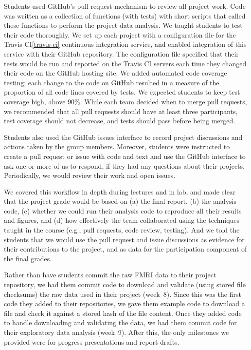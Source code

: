 Students used GitHub's pull request mechanism to review all project work.
Code was written as a collection of functions (with tests) with short
scripts that called these functions to perform the project data analysis.
We taught students to test their code thoroughly.
We set up each project with a configuration file for the Travis
CI\cref{travis-ci} continuous integration service, and enabled integration of
this service with their GitHub repository.  The configuration file specified
that their tests would be run and reported on the Travis CI servers each
time they changed their code on the GitHub hosting site.
We added automated code coverage testing; each change to the code on GitHub
resulted in a measure of the proportion of all code lines covered by tests.
We expected students to keep test coverage high, above 90\%.
While each team decided when to merge pull requests, we recommended that
all pull requests should have at least three participants, test coverage
should not decrease, and tests should pass before being merged.

Students also used the GitHub issues interface to record project discussions
and actions taken by the group members.
Moreover, students were instructed to create a pull request
or issue with code and text and use the GitHub interface to ask one or more
of us to respond, if they had any questions about their projects.
Periodically, we would review their work and open issues.

We covered this workflow in depth during lectures and in lab,
and made clear that the project grade would be based on
(a) the final report,
(b) the analysis code,
(c) whether we could run their analysis code to reproduce all
their results and figures, and
(d) how effectively the team collaborated using the techniques
taught in the course (e.g., pull requests, code review, testing).
And we told the students that we would use the pull request and issue
discussions as evidence for their contributions to the project, and as data for
the participation component of the final grades.

Rather than have students commit the raw FMRI data to their project repository, we had
them commit code to download and validate (using stored file checksums)
the raw data used in their project (week~8).
Since this was the first code they added to their repositories, we gave them example
code to download a file and check it against a stored hash of the file
content.
Once they added code to handle downloading and validating the data,
we had them commit code for their exploratory data analysis (week~9).
After this, the only milestones we provided were for progress
presentations and report drafts.


